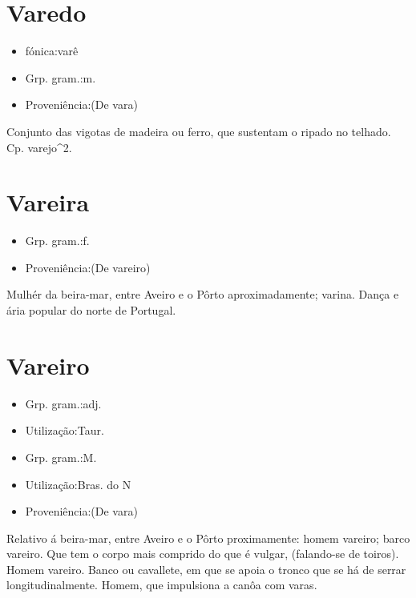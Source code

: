 \documentclass{article}
\begin{document}
\section{Varedo}
\begin{itemize}
\item {fónica:varê}
\end{itemize}
\begin{itemize}
\item {Grp. gram.:m.}
\end{itemize}
\begin{itemize}
\item {Proveniência:(De \textunderscore vara\textunderscore )}
\end{itemize}
Conjunto das vigotas de madeira ou ferro, que sustentam o ripado no telhado. Cp. \textunderscore varejo\textunderscore ^2.
\section{Vareira}
\begin{itemize}
\item {Grp. gram.:f.}
\end{itemize}
\begin{itemize}
\item {Proveniência:(De \textunderscore vareiro\textunderscore )}
\end{itemize}
Mulhér da beira-mar, entre Aveiro e o Pôrto aproximadamente; varina.
Dança e ária popular do norte de Portugal.
\section{Vareiro}
\begin{itemize}
\item {Grp. gram.:adj.}
\end{itemize}
\begin{itemize}
\item {Utilização:Taur.}
\end{itemize}
\begin{itemize}
\item {Grp. gram.:M.}
\end{itemize}
\begin{itemize}
\item {Utilização:Bras. do N}
\end{itemize}
\begin{itemize}
\item {Proveniência:(De \textunderscore vara\textunderscore )}
\end{itemize}
Relativo á beira-mar, entre Aveiro e o Pôrto proximamente: \textunderscore homem vareiro\textunderscore ; \textunderscore barco vareiro\textunderscore .
Que tem o corpo mais comprido do que é vulgar, (falando-se de toiros).
Homem vareiro.
Banco ou cavallete, em que se apoia o tronco que se há de serrar longitudinalmente.
Homem, que impulsiona a canôa com varas.
\end{document}
